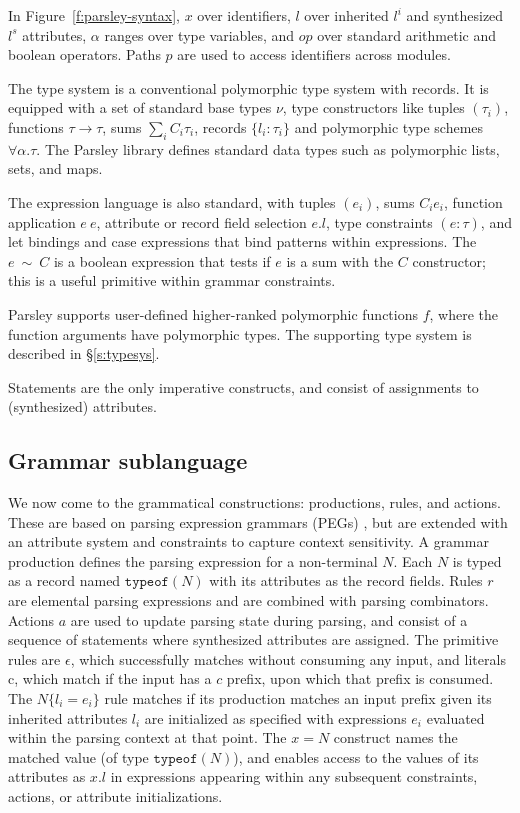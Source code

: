 \documentclass[letterpaper]{article}
\newcommand{\utv}{\alpha}             %
\begin{document}
In Figure~\ref{f:parsley-syntax}, $x$ over identifiers, $l$ over
inherited $l^i$ and synthesized $l^s$ attributes, $\utv$ ranges over
type variables, and $op$ over standard arithmetic and boolean
operators.  Paths $p$ are used to access identifiers across modules.

The type system is a conventional polymorphic type system
with records.  It is equipped with a set of standard base types $\nu$, type
constructors like tuples $(\tau_i)$, functions $\tau\rightarrow\tau$,
sums $\sum_iC_i\tau_i$, records $\{l_i:\tau_i\}$ and
polymorphic type schemes $\forall\utv.\tau$.  The Parsley library
defines standard data types such as polymorphic lists, sets, and maps.

The expression language is also standard, with tuples $(e_i)$, sums
$C_i e_i$, function application $e\ e$, attribute or record field
selection $e.l$, type constraints $(e:\tau)$, and let bindings and
case expressions that bind patterns within expressions.  The
$e\ \sim\ C$ is a boolean expression that tests if $e$ is a sum with
the $C$ constructor; this is a useful primitive within grammar
constraints.

Parsley supports user-defined higher-ranked polymorphic functions $f$,
where the function arguments have polymorphic types.  The supporting
type system is described in \S\ref{s:typesys}.

Statements are the only imperative constructs, and consist of
assignments to (synthesized) attributes.

\subsection*{Grammar sublanguage}
\label{ss:lang:grammar}

We now come to the grammatical constructions: productions, rules, and
actions.  These are based on parsing expression grammars (PEGs)
\cite{ford2004popl}, but are extended with an attribute system and
constraints to capture context sensitivity.  A grammar production
defines the parsing expression for a non-terminal $N$.  Each $N$ is
typed as a record named $\texttt{typeof}(N)$ with its attributes as
the record fields.  Rules $r$ are elemental parsing expressions and
are combined with parsing combinators.  Actions $a$ are used to update
parsing state during parsing, and consist of a sequence of statements
where synthesized attributes are assigned.  The primitive rules are
$\epsilon$, which successfully matches without consuming any input,
and literals $\textrm{c}$, which match if the input has a $c$ prefix,
upon which that prefix is consumed.  The $N\{l_i=e_i\}$ rule matches
if its production matches an input prefix given its inherited
attributes $l_i$ are initialized as specified with expressions $e_i$
evaluated within the parsing context at that point.  The $x=N$
construct names the matched value (of type $\texttt{typeof}(N)$), and
enables access to the values of its attributes as $x.l$ in expressions
appearing within any subsequent constraints, actions, or attribute
initializations.
\end{document}
